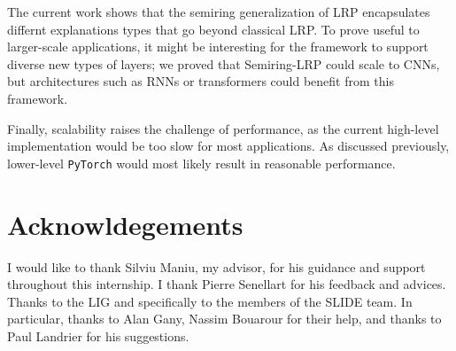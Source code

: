 \documentclass[twocolumn]{../cs-classes/cs-classes}
\newcommand*{\1}{\digitsbb{1}}
\newcommand*{\0}{\digitsbb{0}}
\begin{document}
The current work shows that the semiring generalization of LRP encapsulates differnt explanations types that go beyond classical LRP. To prove useful to larger-scale applications, it might be interesting for the framework to support diverse new types of layers; we proved that Semiring-LRP could scale to CNNs, but architectures such as RNNs or transformers could benefit from this framework.

Finally, scalability raises the challenge of performance, as the current high-level implementation would be too slow for most applications. As discussed previously, lower-level \texttt{PyTorch} would most likely result in reasonable performance.




\section*{Acknowldegements}
I would like to thank Silviu Maniu, my advisor, for his guidance and support throughout this internship. I thank Pierre Senellart for his feedback and advices. Thanks to the LIG and specifically to the members of the SLIDE team. In particular, thanks to Alan Gany, Nassim Bouarour for their help, and thanks to Paul Landrier for his suggestions.

\nocite{*}
\printbibliography

\newpage

\begingroup
\hypersetup{hidelinks}
\tableofcontents
\newpage
\listoffigures
\endgroup

\appendix
\end{document}
